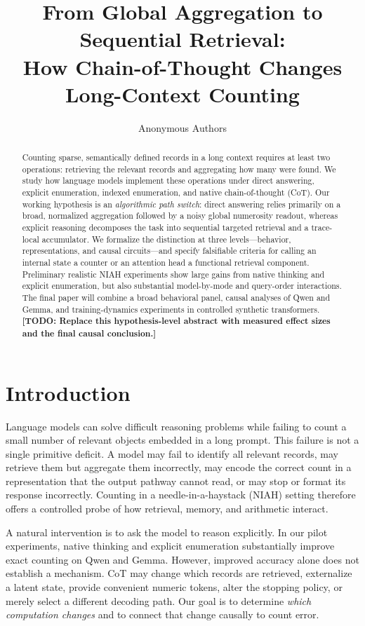 \documentclass[10pt,twocolumn]{article}
\title{\vspace{-1.2em}\textbf{From Global Aggregation to Sequential Retrieval:\\
How Chain-of-Thought Changes Long-Context Counting}}
\author{Anonymous Authors}
\date{}
\newcommand{\todo}[1]{\textcolor{red!75!black}{\textbf{[TODO: #1]}}}
\begin{document}
\maketitle
\vspace{-1.2em}

\begin{abstract}
Counting sparse, semantically defined records in a long context requires at least two operations:
retrieving the relevant records and aggregating how many were found.
We study how language models implement these operations under direct answering, explicit
enumeration, indexed enumeration, and native chain-of-thought (CoT).
Our working hypothesis is an \emph{algorithmic path switch}: direct answering relies primarily on
a broad, normalized aggregation followed by a noisy global numerosity readout, whereas explicit
reasoning decomposes the task into sequential targeted retrieval and a trace-local accumulator.
We formalize the distinction at three levels---behavior, representations, and causal circuits---and
specify falsifiable criteria for calling an internal state a counter or an attention head a functional
retrieval component. Preliminary realistic NIAH experiments show large gains from native thinking
and explicit enumeration, but also substantial model-by-mode and query-order interactions.
The final paper will combine a broad behavioral panel, causal analyses of Qwen and Gemma,
and training-dynamics experiments in controlled synthetic transformers.
\todo{Replace this hypothesis-level abstract with measured effect sizes and the final causal conclusion.}
\end{abstract}

\section{Introduction}
Language models can solve difficult reasoning problems while failing to count a small number of
relevant objects embedded in a long prompt. This failure is not a single primitive deficit.
A model may fail to identify all relevant records, may retrieve them but aggregate them incorrectly,
may encode the correct count in a representation that the output pathway cannot read, or may stop
or format its response incorrectly. Counting in a needle-in-a-haystack (NIAH) setting therefore
offers a controlled probe of how retrieval, memory, and arithmetic interact.

A natural intervention is to ask the model to reason explicitly. In our pilot experiments,
native thinking and explicit enumeration substantially improve exact counting on Qwen and Gemma.
However, improved accuracy alone does not establish a mechanism. CoT may change which records are
retrieved, externalize a latent state, provide convenient numeric tokens, alter the stopping policy,
or merely select a different decoding path. Our goal is to determine \emph{which computation changes}
and to connect that change causally to count error.
\end{document}
